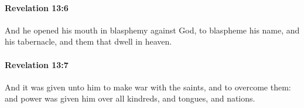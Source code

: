 		\paragraph{Revelation 13:6} %
			\label{REVELATIONNT-13-6}

			And he opened his mouth in blasphemy against God, to blaspheme his name, and his tabernacle, and them that dwell in heaven.

			\begin{framed}
			\scriptsize
				\begin{compactdesc}
					\item[SBLG] 
				\end{compactdesc}
			\end{framed}

		\paragraph{Revelation 13:7} %
			\label{REVELATIONNT-13-7}

			And it was given unto him to make war with the saints, and to overcome them: and power was given him over all kindreds, and tongues, and nations.

